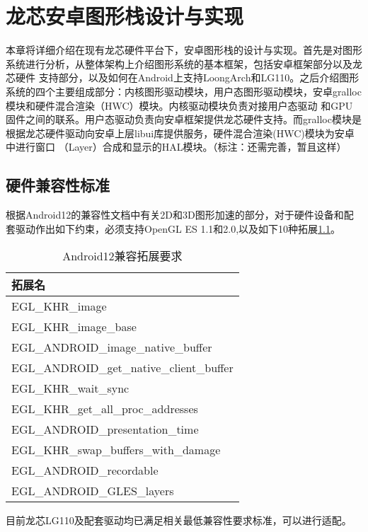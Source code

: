 
\chapter{龙芯安卓图形栈设计与实现}
本章将详细介绍在现有龙芯硬件平台下，安卓图形栈的设计与实现。首先是对图形系统进行分析，从整体架构上介绍图形系统的基本框架，包括安卓框架部分以及龙芯硬件
支持部分，以及如何在Android上支持LoongArch和LG110。之后介绍图形系统的四个主要组成部分：内核图形驱动模块，用户态图形驱动模块，安卓gralloc模块和硬件混合渲染（HWC）模块。内核驱动模块负责对接用户态驱动
和GPU固件之间的联系。用户态驱动负责向安卓框架提供龙芯硬件支持。而gralloc模块是根据龙芯硬件驱动向安卓上层libui库提供服务，硬件混合渲染(HWC)模块为安卓中进行窗口
（Layer）合成和显示的HAL模块。（标注：还需完善，暂且这样）

\section{硬件兼容性标准}
根据Android12的兼容性文档\cite{Android-12-cdd}中有关2D和3D图形加速的部分，对于硬件设备和配套驱动作出如下约束，必须支持OpenGL ES 1.1和2.0,以及如下10种拓展\ref{tab:Android12兼容拓展要求}。
\begin{table}[h]
  \centering
  \caption{Android12兼容拓展要求}
  \label{tab:Android12兼容拓展要求}
  \begin{tabular}{l}
    \toprule
    拓展名  \\
    \midrule
    EGL\_KHR\_image \\
    EGL\_KHR\_image\_base \\
    EGL\_ANDROID\_image\_native\_buffer \\
    EGL\_ANDROID\_get\_native\_client\_buffer \\
    EGL\_KHR\_wait\_sync \\
    EGL\_KHR\_get\_all\_proc\_addresses \\
    EGL\_ANDROID\_presentation\_time \\
    EGL\_KHR\_swap\_buffers\_with\_damage \\
    EGL\_ANDROID\_recordable \\
    EGL\_ANDROID\_GLES\_layers \\
    \bottomrule
  \end{tabular}
  \note{}
\end{table}
目前龙芯LG110及配套驱动均已满足相关最低兼容性要求标准，可以进行适配。


